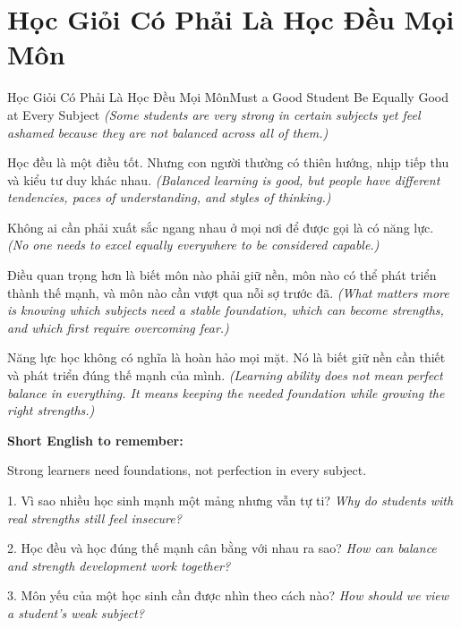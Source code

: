\section{Học Giỏi Có Phải Là Học Đều Mọi Môn}
\begin{truyen}{Học Giỏi Có Phải Là Học Đều Mọi Môn}{Must a Good Student Be Equally Good at Every Subject}
\textit{(Some students are very strong in certain subjects yet feel ashamed because they are not balanced across all of them.)}

Học đều là một điều tốt. Nhưng con người thường có thiên hướng, nhịp tiếp thu và kiểu tư duy khác nhau.
\textit{(Balanced learning is good, but people have different tendencies, paces of understanding, and styles of thinking.)}

Không ai cần phải xuất sắc ngang nhau ở mọi nơi để được gọi là có năng lực.
\textit{(No one needs to excel equally everywhere to be considered capable.)}

Điều quan trọng hơn là biết môn nào phải giữ nền, môn nào có thể phát triển thành thế mạnh, và môn nào cần vượt qua nỗi sợ trước đã.
\textit{(What matters more is knowing which subjects need a stable foundation, which can become strengths, and which first require overcoming fear.)}
\end{truyen}

\begin{baihoc}
Năng lực học không có nghĩa là hoàn hảo mọi mặt. Nó là biết giữ nền cần thiết và phát triển đúng thế mạnh của mình.
\textit{(Learning ability does not mean perfect balance in everything. It means keeping the needed foundation while growing the right strengths.)}
\end{baihoc}

\begin{ghinhoanh}
\textbf{Short English to remember:}

Strong learners need foundations, not perfection in every subject.

\end{ghinhoanh}

\begin{tuhocnhanh}
1. Vì sao nhiều học sinh mạnh một mảng nhưng vẫn tự ti? \textit{Why do students with real strengths still feel insecure?}

2. Học đều và học đúng thế mạnh cân bằng với nhau ra sao? \textit{How can balance and strength development work together?}

3. Môn yếu của một học sinh cần được nhìn theo cách nào? \textit{How should we view a student's weak subject?}
\end{tuhocnhanh}
\ngancach


